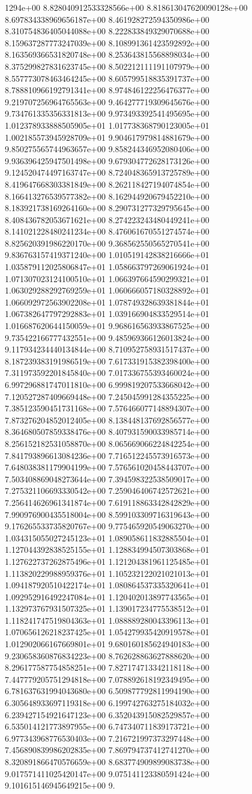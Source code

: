 1294e+00	8.828040912533328566e+00	8.818613047620090128e+00	8.697834338969656187e+00	8.461928272594350986e+00	8.310754836405044088e+00	8.222833849329070688e+00	8.159637287773247039e+00	8.108991361423592892e+00	8.163569366531820748e+00	8.253643815568898034e+00	8.375299827831623745e+00	8.502212111191107979e+00	8.557773078463464245e+00	8.605799518835391737e+00	8.788810966192791341e+00	8.974846122256476377e+00	9.219707256964765563e+00	9.464277719309645676e+00	9.734761335356331813e+00	9.973493392541495695e+00	1.012378933888505905e+01	1.017738368790123005e+01	1.002185573945928709e+01	9.904617979814881679e+00	9.850275565744963657e+00	9.858244346952080406e+00	9.936396425947501498e+00	9.679304772628173126e+00	9.124520474497163747e+00	8.724048365913725789e+00	8.419647668303381849e+00	8.262118427194074854e+00	8.166413276539577382e+00	8.162944920679452210e+00	8.183921738169264160e+00	8.290731277329795645e+00	8.408436782053671621e+00	8.274223243480449241e+00	8.141021228480241234e+00	8.476061670551274574e+00	8.825620391986220170e+00	9.368562550565270541e+00	9.836763157419371240e+00	1.010519142838216666e+01	1.035879112025806847e+01	1.058663797269061924e+01	1.071307023124100510e+01	1.066397664590299321e+01	1.063029288292769259e+01	1.060666057180328892e+01	1.066092972563902208e+01	1.078749328639381844e+01	1.067382647797292883e+01	1.039166904833529514e+01	1.016687620644150059e+01	9.968616563933867525e+00	9.735422166777432551e+00	9.485969366126013824e+00	9.117934234440134844e+00	8.710952758931517437e+00	8.187239383191986519e+00	7.617331915382398400e+00	7.311973592201845840e+00	7.017336755393460024e+00	6.997296881747011810e+00	6.999819207533668042e+00	7.120527287409669448e+00	7.245045991284355225e+00	7.385123590451731168e+00	7.576466077148894307e+00	7.873276204852012405e+00	8.138448137692856577e+00	8.364680507859338476e+00	8.407931590033985714e+00	8.256152182531058870e+00	8.065669066224842254e+00	7.841793896613084236e+00	7.716512245573916573e+00	7.648038381179904199e+00	7.576561020458443707e+00	7.503408869048273644e+00	7.394598322538509017e+00	7.275321106693330542e+00	7.259046406742572621e+00	7.256414626961341874e+00	7.619118863342842829e+00	7.990976900435518004e+00	8.599103309716319643e+00	9.176265533735820767e+00	9.775465920549063270e+00	1.034315055027245123e+01	1.089058611832885504e+01	1.127044392838525155e+01	1.128834994507303868e+01	1.127622737262875496e+01	1.121204381961125485e+01	1.113820229988959376e+01	1.105232122021021013e+01	1.094187920510422174e+01	1.080864537335320641e+01	1.092952916492247084e+01	1.120402013897743565e+01	1.132973767931507325e+01	1.139017234775538512e+01	1.118241747519804363e+01	1.088889280043396113e+01	1.070656126218237425e+01	1.054279935420919578e+01	1.012902066167669801e+01	9.680160185624940183e+00	9.230658360876834223e+00	8.762628863627888620e+00	8.296177587754858251e+00	7.827174713342118118e+00	7.447779205751294818e+00	7.078892618192349495e+00	6.781637631994043680e+00	6.509877792811994190e+00	6.305648933697119318e+00	6.199742763275184032e+00	6.239427154921647123e+00	6.352043915082529857e+00	6.535014121773897955e+00	6.747340711839173721e+00	6.977343968776530403e+00	7.216721997373297448e+00	7.456890839986202835e+00	7.869794737412741270e+00	8.320891866470576659e+00	8.683774909899083738e+00	9.017571411025420147e+00	9.075141123380591424e+00	9.101615146945649215e+00	9.